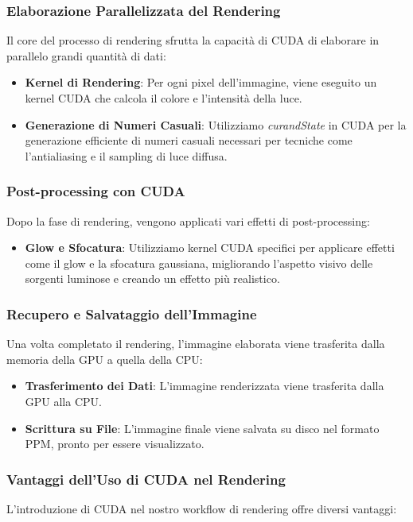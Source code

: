 \documentclass[12pt]{article}
\begin{document}
\subsubsection{Elaborazione Parallelizzata del Rendering}
Il core del processo di rendering sfrutta la capacità di CUDA di elaborare in parallelo grandi quantità di dati:

\begin{itemize}
\item \textbf{Kernel di Rendering}: Per ogni pixel dell'immagine, viene eseguito un kernel CUDA che calcola il colore e l'intensità della luce.
\item \textbf{Generazione di Numeri Casuali}: Utilizziamo \textit{curandState} in CUDA per la generazione efficiente di numeri casuali necessari per tecniche come l'antialiasing e il sampling di luce diffusa.
\end{itemize}

\subsubsection{Post-processing con CUDA}
Dopo la fase di rendering, vengono applicati vari effetti di post-processing:

\begin{itemize}
\item \textbf{Glow e Sfocatura}: Utilizziamo kernel CUDA specifici per applicare effetti come il glow e la sfocatura gaussiana, migliorando l'aspetto visivo delle sorgenti luminose e creando un effetto più realistico.
\end{itemize}

\subsubsection{Recupero e Salvataggio dell'Immagine}
Una volta completato il rendering, l'immagine elaborata viene trasferita dalla memoria della GPU a quella della CPU:

\begin{itemize}
\item \textbf{Trasferimento dei Dati}: L'immagine renderizzata viene trasferita dalla GPU alla CPU.

\item \textbf{Scrittura su File}: L'immagine finale viene salvata su disco nel formato PPM, pronto per essere visualizzato.
\end{itemize}

\subsubsection{Vantaggi dell'Uso di CUDA nel Rendering}
L'introduzione di CUDA nel nostro workflow di rendering offre diversi vantaggi:
\end{document}
